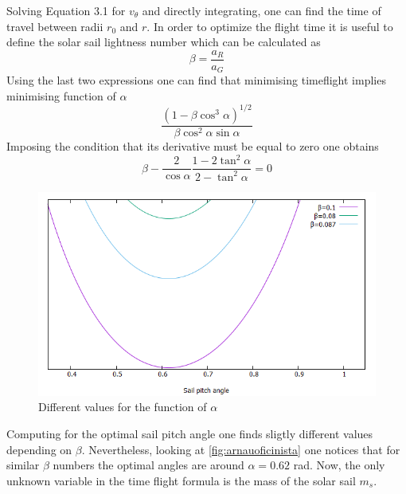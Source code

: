 \documentclass[twocolumn,12pt,a4paper]{article}
\numberwithin{equation}{section}
\begin{document}
Solving Equation 3.1 for $v_{\theta}$ and directly integrating, one can find the time of travel between radii $r_0$ and $r$.
In order to optimize the flight time it is useful to define the solar sail lightness number which can be calculated as
\begin{equation}
	\beta=\frac{a_R}{a_G}
\end{equation}
Using the last two expressions one can find that minimising timeflight implies minimising function of $\alpha$
\begin{equation}
	\frac{(1-\beta\cos^3\alpha)^{1/2}}{\beta\cos^2\alpha\sin\alpha}
\end{equation}
Imposing the condition that its derivative must be equal to zero one obtains
\begin{equation}
	\beta-\frac{2}{\cos\alpha}\frac{1-2\tan^2\alpha}{2-\tan^2\alpha}=0
\end{equation}
\begin{figure}[h] \label{fig:arnauoficinista}
	
	\centering
	\includegraphics[scale=0.3]{angle.png}
	\caption{\small Different values for the function of $\alpha$}
\end{figure}
Computing for the optimal sail pitch angle one finds sligtly different values depending on $\beta$. Nevertheless, looking at \autoref{fig:arnauoficinista} one notices that for similar $\beta$ numbers the optimal angles are around $\alpha=0.62$ rad. Now, the only unknown variable in the time flight formula is the mass of the solar sail $m_s$.
\end{document}

